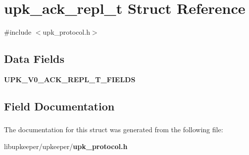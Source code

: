 \section{upk\_\-ack\_\-repl\_\-t Struct Reference}
\label{structupk__ack__repl__t}


{\ttfamily \#include $<$upk\_\-protocol.h$>$}

\subsection*{Data Fields}
\begin{DoxyCompactItemize}
\item 
{\bf UPK\_\-V0\_\-ACK\_\-REPL\_\-T\_\-FIELDS}
\end{DoxyCompactItemize}


\subsection{Field Documentation}
\subsubsection[{UPK\_\-V0\_\-ACK\_\-REPL\_\-T\_\-FIELDS}]{}\label{structupk__ack__repl__t_a065dea86ace82d8b31b83d3883ba292d}


The documentation for this struct was generated from the following file:\begin{DoxyCompactItemize}
\item 
libupkeeper/upkeeper/{\bf upk\_\-protocol.h}\end{DoxyCompactItemize}
